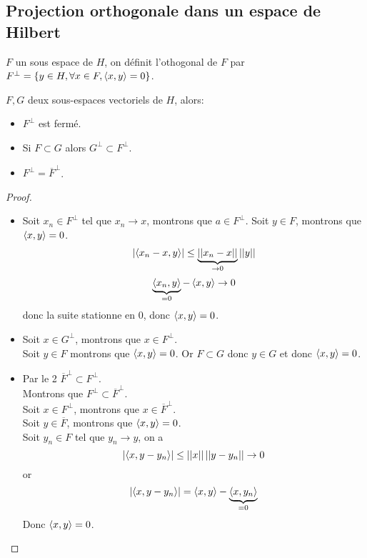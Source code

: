 \subsection{Projection orthogonale dans un espace de Hilbert}



\begin{definition}
	$F$ un sous espace de $H$, on définit l'othogonal de $F$ par $F^\perp = \{y \in H, \forall x \in F, \left\langle x, y \right\rangle = 0\}$.
\end{definition}

\begin{prop}
	$F, G$ deux sous-espaces vectoriels de $H$, alors:
	\begin{itemize}
		\item $F^\perp$ est fermé.
		\item Si $F \subset G$ alors $G^\perp \subset F^\perp$.
		\item $F^\perp = \overline{F}^\perp$.
	\end{itemize}
\end{prop}


\begin{proof}
	\begin{itemize}
		\item Soit $x_n \in F^\perp$ tel que $x_n \to x$, montrons que $a \in F^\perp$.
		      Soit $y \in F$, montrons que $\left\langle x, y \right\rangle = 0$.
		      $$ \left|\left\langle x_n-x, y \right\rangle\right| \leq  \underbrace{\left|\left|x_n-x\right|\right|}_{\to 0} \left|\left|y\right|\right| $$
		      $$ \underbrace{\left\langle x_n, y \right\rangle}_{=0} - \left\langle x, y \right\rangle  \to 0 $$
		      donc la suite stationne en 0, donc $\left\langle x, y \right\rangle = 0$.

		\item Soit $x \in G^\perp$, montrons que $x \in F^\perp$.\\
		      Soit $y \in F$ montrons que $\left\langle x, y \right\rangle = 0$. Or $F \subset G$ donc $y \in G$ et donc $\left\langle x, y \right\rangle = 0$.
		\item Par le 2 $\overline{F}^\perp \subset F^\perp$.\\
		      Montrons que $F^\perp \subset \overline{F}^\perp$.\\
		      Soit $x \in F^\perp$, montrons que $x \in \overline{F}^\perp$.\\
		      Soit $y \in \overline{F}$, montrons que $\left\langle x, y \right\rangle = 0$.\\
		      Soit $y_n \in F$ tel que $y_n \to y$, on a
		      $$ \left|\left\langle x, y- y_n \right\rangle\right| \leq \left|\left|x\right|\right| \left|\left|y-y_n\right|\right| \to 0 $$
		      or
		      $$  \left|\left\langle x, y- y_n \right\rangle\right| = \left\langle x, y \right\rangle -  \underbrace{\left\langle x, y_n \right\rangle}_{=0} $$
		      Donc $\left\langle x, y \right\rangle = 0$.
	\end{itemize}
\end{proof}

